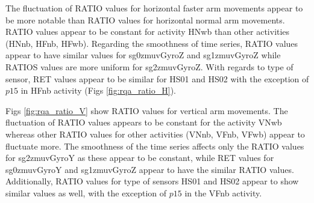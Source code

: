 The fluctuation of RATIO values for horizontal faster arm movements 
appear to be more notable than RATIO values for horizontal normal arm 
movements. RATIO values appear to be constant for activity HNwb than
other activities (HNnb, HFnb, HFwb).
Regarding the smoothness of time series, RATIO values appear to have 
similar values for sg0zmuvGyroZ and sg1zmuvGyroZ while RATIOS values 
are more uniform for sg2zmuvGyroZ.
With regards to type of sensor, 
RET values appear to be similar for HS01 and HS02 with the exception of
$p15$ in HFnb activity (Figs \ref{fig:rqa_ratio_H}).

Figs \ref{fig:rqa_ratio_V} show RATIO values for vertical arm movements.
The fluctuation of RATIO values appears to be constant for the activity 
VNwb whereas other RATIO values for other activities (VNnb, VFnb, VFwb) 
appear to fluctuate more.
The smoothness of the time series affects only the RATIO values for 
sg2zmuvGyroY as these appear to be constant, while RET values for 
sg0zmuvGyroY and sg1zmuvGyroZ appear to have the similar RATIO values.
Additionally, RATIO values for type of sensors HS01 and HS02 appear 
to show similar values as well, with the exception of $p15$ in the 
VFnb activity.

